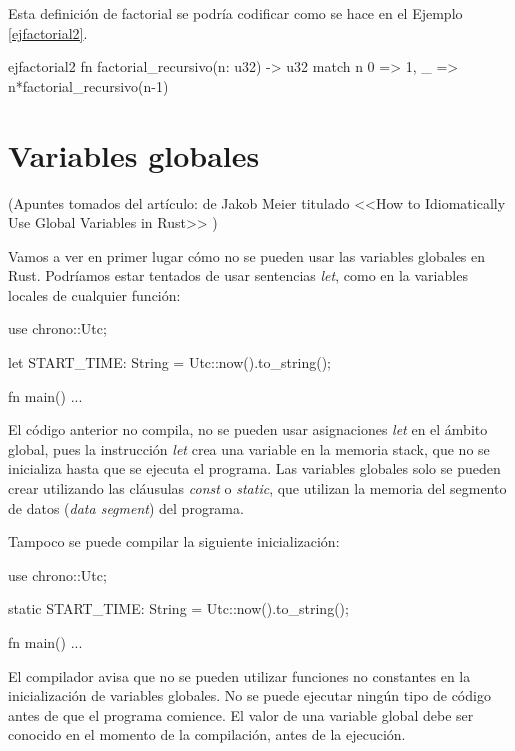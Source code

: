 \documentclass[a4paper,11pt]{extarticle}
\begin{document}
Esta definición de factorial se podría codificar como se hace en el Ejemplo \ref{ejfactorial2}.

\vspace{1em}
\begin{EjemploCodigo}{ejfactorial2}
fn factorial_recursivo(n: u32) -> u32 {
   match n {
      0 => 1,
      _ => n*factorial_recursivo(n-1)
   }
}
\end{EjemploCodigo}



\section{Variables globales}

{\small\color{blue}(Apuntes tomados del artículo: de Jakob Meier titulado <<How to Idiomatically Use Global Variables in Rust>> \citep{meierHowIdiomaticallyUse2021})}

Vamos a ver en primer lugar cómo no se pueden usar las variables globales en Rust. Podríamos estar tentados de usar sentencias \textit{let}, como en la variables locales de cualquier función:

\vspace{0.7em}
\begin{Codigo2}
use chrono::Utc;

let START_TIME: String = Utc::now().to_string();

fn main() {
   ...
}
\end{Codigo2}

El código anterior no compila, no se pueden usar asignaciones \textit{let} en el ámbito global, pues la instrucción \textit{let} crea una variable en la memoria stack, que no se inicializa hasta que se ejecuta el programa. Las variables globales solo se pueden crear utilizando las cláusulas \textit{const} o \textit{static}, que utilizan la memoria del segmento de datos (\textit{data segment}) del programa. 

Tampoco se puede compilar la siguiente inicialización:

\vspace{0.7em}
\begin{Codigo2}
use chrono::Utc;

static START_TIME: String = Utc::now().to_string();
	
fn main() {
   ...
}
\end{Codigo2}

El compilador avisa que no se pueden utilizar funciones no constantes en la inicialización de variables globales. No se puede ejecutar ningún tipo de código antes de que el programa comience. El valor de una variable global debe ser conocido en el momento de la compilación, antes de la ejecución. 
\end{document}
